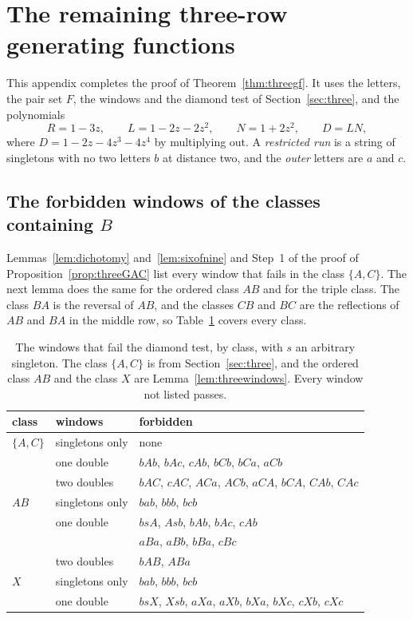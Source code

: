 \section{The remaining three-row generating functions}\label{app:threegf}

This appendix completes the proof of Theorem~\ref{thm:threegf}. It uses the letters, the pair
set $F$, the windows and the diamond test of Section~\ref{sec:three}, and the polynomials
\[
R=1-3z,\qquad L=1-2z-2z^2,\qquad N=1+2z^2,\qquad D=LN,
\]
where $D=1-2z-4z^3-4z^4$ by multiplying out. A \emph{restricted run} is a string of singletons with no two letters $b$ at distance two,
and the \emph{outer} letters are $a$ and $c$.

\subsection{The forbidden windows of the classes containing \texorpdfstring{$B$}{B}}

Lemmas~\ref{lem:dichotomy} and~\ref{lem:sixofnine} and Step~1 of the proof of
Proposition~\ref{prop:threeGAC} list every window that fails in the class $\{A,C\}$. The next
lemma does the same for the ordered class $AB$ and for the triple class. The class $BA$ is the
reversal of $AB$, and the classes $CB$ and $BC$ are the reflections of $AB$ and $BA$ in the
middle row, so Table~\ref{tab:threewindows} covers every class.

\begin{table}[t]
\centering\small
\begin{tabular}{@{}lll@{}}
\toprule
class & windows & forbidden \\
\midrule
$\{A,C\}$ & singletons only & none \\
 & one double & $bAb$, $bAc$, $cAb$, $bCb$, $bCa$, $aCb$ \\
 & two doubles & $bAC$, $cAC$, $ACa$, $ACb$, $aCA$, $bCA$, $CAb$, $CAc$ \\
$AB$ & singletons only & $bab$, $bbb$, $bcb$ \\
 & one double & $bsA$, $Asb$, $bAb$, $bAc$, $cAb$ \\
 & & $aBa$, $aBb$, $bBa$, $cBc$ \\
 & two doubles & $bAB$, $ABa$ \\
$X$ & singletons only & $bab$, $bbb$, $bcb$ \\
 & one double & $bsX$, $Xsb$, $aXa$, $aXb$, $bXa$, $bXc$, $cXb$, $cXc$ \\
\bottomrule
\end{tabular}
\caption{The windows that fail the diamond test, by class, with $s$ an arbitrary singleton.
The class $\{A,C\}$ is from Section~\ref{sec:three}, and the ordered class $AB$ and the class
$X$ are Lemma~\ref{lem:threewindows}. Every window not listed passes.}
\label{tab:threewindows}
\end{table}

